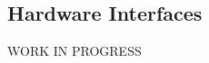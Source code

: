 \documentclass[../../../rasd.tex]{subfiles}
\begin{document}
\subsection{Hardware Interfaces}
			WORK IN PROGRESS
\end{document}
